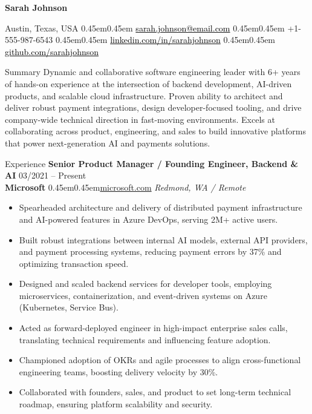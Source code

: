 \documentclass[10pt, letterpaper]{article}
\makeatletter
\renewcommand{\section}{%
  \@startsection{section}{1}{\z@}{10pt}{6pt}{%
    \Large\bfseries\color{black}%
  }%
}
\newcommand{\bull}{\kern0.45em\textbullet\kern0.45em}
\newcommand{\role}[1]{\textbf{#1}}
\newcommand{\org}[1]{\textbf{#1}}
\newcommand{\place}[1]{\textit{#1}}
\newcommand{\blackLink}[2]{\href{#1}{\textcolor{black}{#2}}}
\renewcommand{\maketitle}{
  \begin{center}
    {\huge\bfseries Sarah Johnson}\par\vspace{6pt}
    {\color{Primary}
      Austin, Texas, USA \bull
      \blackLink{mailto:sarah.johnson@email.com}{sarah.johnson@email.com} \bull
      +1-555-987-6543 \bull
      \blackLink{https://linkedin.com/in/sarahjohnson}{linkedin.com/in/sarahjohnson} \bull
      \blackLink{https://github.com/sarahjohnson}{github.com/sarahjohnson}
    }
  \end{center}
  \vspace{-8pt}
}
\makeatother
\begin{document}
\maketitle
\vspace{15pt}

\section{Summary}
Dynamic and collaborative software engineering leader with 6+ years of hands-on experience at the intersection of backend development, AI-driven products, and scalable cloud infrastructure. Proven ability to architect and deliver robust payment integrations, design developer-focused tooling, and drive company-wide technical direction in fast-moving environments. Excels at collaborating across product, engineering, and sales to build innovative platforms that power next-generation AI and payments solutions.

\section{Experience}
\role{Senior Product Manager / Founding Engineer, Backend \& AI} \hfill 03/2021 -- Present \\
\org{Microsoft} \bull \href{https://microsoft.com}{microsoft.com} \hfill \place{Redmond, WA / Remote}
\begin{itemize}
  \item Spearheaded architecture and delivery of distributed payment infrastructure and AI-powered features in Azure DevOps, serving 2M+ active users.
  \item Built robust integrations between internal AI models, external API providers, and payment processing systems, reducing payment errors by 37\% and optimizing transaction speed.
  \item Designed and scaled backend services for developer tools, employing microservices, containerization, and event-driven systems on Azure (Kubernetes, Service Bus).
  \item Acted as forward-deployed engineer in high-impact enterprise sales calls, translating technical requirements and influencing feature adoption.
  \item Championed adoption of OKRs and agile processes to align cross-functional engineering teams, boosting delivery velocity by 30\%.
  \item Collaborated with founders, sales, and product to set long-term technical roadmap, ensuring platform scalability and security.
\end{itemize}
\vspace{12pt}
\end{document}
